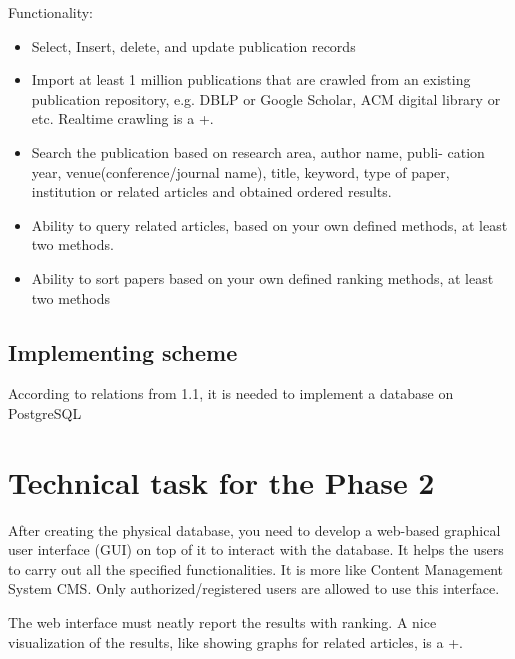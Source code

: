 \documentclass[12pt,a4paper]{article}
\begin{document}
Functionality:
\begin{itemize}
\item Select, Insert, delete, and update publication records
\item Import at least 1 million publications that are crawled from an existing publication repository, e.g. DBLP or Google Scholar, ACM digital
library or etc. Realtime crawling is a +.
\item Search the publication based on research area, author name, publi-
cation year, venue(conference/journal name), title, keyword, type of
paper, institution or related articles and obtained ordered results.
\item Ability to query related articles, based on your own defined methods,
\color{red}
at least two methods.
\color{black}
\item Ability to sort papers based on your own defined ranking methods, \color{red}at least two methods\color{black}
\end{itemize}
\subsection{Implementing scheme}
According to relations from 1.1, it is needed to implement a database on PostgreSQL
\section{Technical task for the Phase 2}
After creating the physical database, you need to develop a web-based graphical user interface (GUI) on top of it to interact with the database. It helps the users to carry out all the specified functionalities. It is more like Content Management System CMS. Only authorized/registered users are allowed to use this interface.

The web interface must neatly report the results with ranking. A nice visualization of the results, like showing graphs for related articles, is a +.
\end{document}
